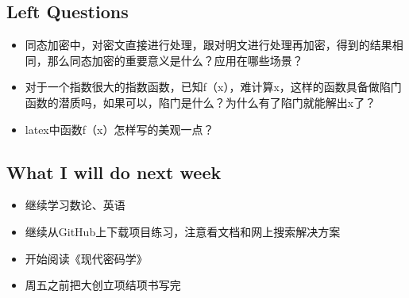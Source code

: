 \documentclass[a4paper]{article}
\begin{document}
\begin{CJK}{UTF8}{gbsn}
\subsection{Left Questions}
\begin{itemize}
\item 同态加密中，对密文直接进行处理，跟对明文进行处理再加密，得到的结果相同，那么同态加密的重要意义是什么？应用在哪些场景？
\item 对于一个指数很大的指数函数，已知f（x），难计算x，这样的函数具备做陷门函数的潜质吗，如果可以，陷门是什么？为什么有了陷门就能解出x了？
\item latex中函数f（x）怎样写的美观一点？
\end{itemize}


\subsection{What I will do next week}
\begin{itemize}
\item 继续学习数论、英语
\item 继续从GitHub上下载项目练习，注意看文档和网上搜索解决方案
\item 开始阅读《现代密码学》
\item 周五之前把大创立项结项书写完
\end{itemize}

\begin{comment}
\begin{thebibliography}{1}

\bibitem{Kish12}
L.B.~Kish et al., Information Networks Secured by the Laws of Physics. IEICE Trans. Commun. Vol. E95-B, No.5, May 2012.

\bibitem{Zcash}
ref. info. of Zcash. 

\end{thebibliography}
\end{comment}

\end{CJK}
\end{document}
